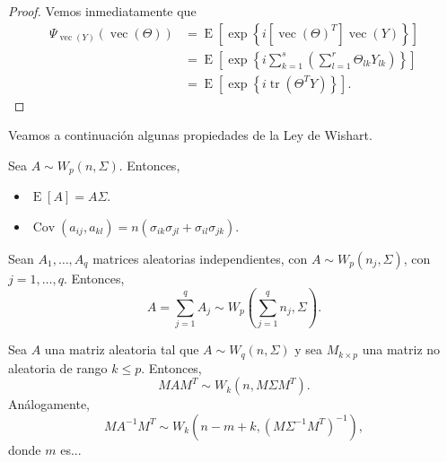 \begin{proof}
  Vemos inmediatamente que
  \begin{align*}
    \Psi_{\operatorname{vec}(Y)}\left(\operatorname{vec}(\Theta)\right)
    &= \operatorname{E}\left[
      \exp\left\{
        i[\operatorname{vec}(\Theta)^T]\operatorname{vec}(Y)
        \right\}
      \right]\\
    &= \operatorname{E}\left[
      \exp\left\{
        i\sum_{k=1}^s
          \left(
            \sum_{l=1}^r \Theta_{lk}Y_{lk}
          \right)
        \right\}
      \right]\\
    &= \operatorname{E}\left[\exp\left\{i \operatorname{tr}\left(\Theta^T Y\right)\right\}\right].
  \end{align*}
\end{proof}


Veamos a continuación algunas propiedades de la Ley de Wishart.

\begin{nprop}
  Sea \(A \sim W_p(n, \Sigma)\). Entonces, \begin{itemize}
    \item \(\operatorname{E}[A] = A\Sigma\).
    \item \(\operatorname{Cov}(a_{ij}, a_{kl}) = n(\sigma_{ik}\sigma_{jl}+ \sigma_{il}\sigma_{jk})\).
  \end{itemize}
\end{nprop}

\begin{nprop}
  Sean \(A_1, \dots, A_q\) matrices aleatorias independientes, con \(A \sim W_p(n_{j}, \Sigma)\), con \(j = 1, \dots, q\).
  Entonces,
  \[
    A = \sum_{j=1}^q A_j \sim W_p\left(\sum_{j=1}^q n_j, \Sigma\right).
  \]
\end{nprop}

\begin{nprop}
  Sea \(A\) una matriz aleatoria tal que \(A \sim W_q(n, \Sigma)\) y sea \(M_{k\times p}\) una matriz no aleatoria de rango \(k \leq p\). 
  Entonces, 
  \[
    MAM^T \sim W_k(n, M\Sigma M^T).
  \]
  Análogamente,
  \[
    MA^{-1}M^T \sim W_k\left(n-m+k, \left(M\Sigma^{-1} M^T\right)^{-1}\right),
  \]
  donde \(m\) es... 
\end{nprop}


